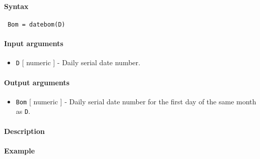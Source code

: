 


	\paragraph{Syntax}
 
 \begin{verbatim}
 Bom = datebom(D)
 \end{verbatim}
 
 \paragraph{Input arguments}
 
 \begin{itemize}
 \item
   \texttt{D} {[} numeric {]} - Daily serial date number.
 \end{itemize}
 
 \paragraph{Output arguments}
 
 \begin{itemize}
 \item
   \texttt{Bom} {[} numeric {]} - Daily serial date number for the first
   day of the same month as \texttt{D}.
 \end{itemize}
 
 \paragraph{Description}
 
 \paragraph{Example}


